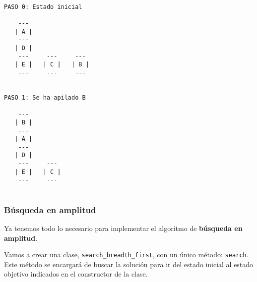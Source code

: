 \documentclass[11pt]{article}
\begin{document}
    \begin{Verbatim}[commandchars=\\\{\}]

PASO 0: Estado inicial

    --- 
   | A |
    --- 
   | D |
    ---     ---     --- 
   | E |   | C |   | B |
    ---     ---     --- 


PASO 1: Se ha apilado B

    --- 
   | B |
    --- 
   | A |
    --- 
   | D |
    ---     --- 
   | E |   | C |
    ---     --- 


    \end{Verbatim}

    \hypertarget{buxfasqueda-en-amplitud}{%
\subsubsection{Búsqueda en amplitud}\label{buxfasqueda-en-amplitud}}

Ya tenemos todo lo necesario para implementar el algoritmo de
\textbf{búsqueda en amplitud}.

Vamos a crear una clase, \texttt{search\_breadth\_first}, con un único
método: \texttt{search}. Este método se encargará de buscar la solución
para ir del estado inicial al estado objetivo indicados en el
constructor de la clase.
\end{document}
